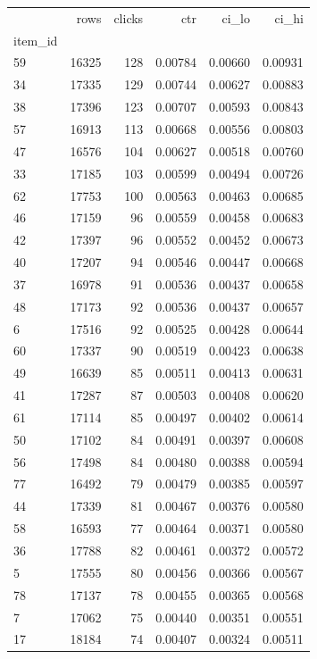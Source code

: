 \begin{tabular}{lrrrrr}
\toprule
 & rows & clicks & ctr & ci\_lo & ci\_hi \\
item\_id &  &  &  &  &  \\
\midrule
59 & 16325 & 128 & 0.00784 & 0.00660 & 0.00931 \\
34 & 17335 & 129 & 0.00744 & 0.00627 & 0.00883 \\
38 & 17396 & 123 & 0.00707 & 0.00593 & 0.00843 \\
57 & 16913 & 113 & 0.00668 & 0.00556 & 0.00803 \\
47 & 16576 & 104 & 0.00627 & 0.00518 & 0.00760 \\
33 & 17185 & 103 & 0.00599 & 0.00494 & 0.00726 \\
62 & 17753 & 100 & 0.00563 & 0.00463 & 0.00685 \\
46 & 17159 & 96 & 0.00559 & 0.00458 & 0.00683 \\
42 & 17397 & 96 & 0.00552 & 0.00452 & 0.00673 \\
40 & 17207 & 94 & 0.00546 & 0.00447 & 0.00668 \\
37 & 16978 & 91 & 0.00536 & 0.00437 & 0.00658 \\
48 & 17173 & 92 & 0.00536 & 0.00437 & 0.00657 \\
6 & 17516 & 92 & 0.00525 & 0.00428 & 0.00644 \\
60 & 17337 & 90 & 0.00519 & 0.00423 & 0.00638 \\
49 & 16639 & 85 & 0.00511 & 0.00413 & 0.00631 \\
41 & 17287 & 87 & 0.00503 & 0.00408 & 0.00620 \\
61 & 17114 & 85 & 0.00497 & 0.00402 & 0.00614 \\
50 & 17102 & 84 & 0.00491 & 0.00397 & 0.00608 \\
56 & 17498 & 84 & 0.00480 & 0.00388 & 0.00594 \\
77 & 16492 & 79 & 0.00479 & 0.00385 & 0.00597 \\
44 & 17339 & 81 & 0.00467 & 0.00376 & 0.00580 \\
58 & 16593 & 77 & 0.00464 & 0.00371 & 0.00580 \\
36 & 17788 & 82 & 0.00461 & 0.00372 & 0.00572 \\
5 & 17555 & 80 & 0.00456 & 0.00366 & 0.00567 \\
78 & 17137 & 78 & 0.00455 & 0.00365 & 0.00568 \\
7 & 17062 & 75 & 0.00440 & 0.00351 & 0.00551 \\
17 & 18184 & 74 & 0.00407 & 0.00324 & 0.00511 \\

\end{tabular}
